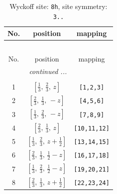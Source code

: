 \documentclass[fleqn,8pt]{jsarticle}
\begin{document}
\begin{longtable}{ccc}
\caption{Wyckoff site: {\tt 8h}, site symmetry: {\tt 3..}}
 \\
 \hline \hline
No. & position & mapping \\ \hline \endfirsthead

\multicolumn{2}{l}{\tablename\ \thetable{}} \\
 \hline \hline
No. & position & mapping \\ \hline \endhead

 \hline \hline
\multicolumn{2}{r}{\footnotesize\it continued ...} \\ \endfoot

 \hline \hline
\multicolumn{2}{r}{} \\ \endlastfoot

1 & $\left[ \frac{1}{3},\, \frac{2}{3},\, z \right]$ & {\tt [1,2,3]} \\ \hline
2 & $\left[ \frac{2}{3},\, \frac{1}{3},\, - z \right]$ & {\tt [4,5,6]} \\ \hline
3 & $\left[ \frac{1}{3},\, \frac{2}{3},\, - z \right]$ & {\tt [7,8,9]} \\ \hline
4 & $\left[ \frac{2}{3},\, \frac{1}{3},\, z \right]$ & {\tt [10,11,12]} \\ \hline
5 & $\left[ \frac{1}{3},\, \frac{2}{3},\, z + \frac{1}{2} \right]$ & {\tt [13,14,15]} \\ \hline
6 & $\left[ \frac{2}{3},\, \frac{1}{3},\, \frac{1}{2} - z \right]$ & {\tt [16,17,18]} \\ \hline
7 & $\left[ \frac{1}{3},\, \frac{2}{3},\, \frac{1}{2} - z \right]$ & {\tt [19,20,21]} \\ \hline
8 & $\left[ \frac{2}{3},\, \frac{1}{3},\, z + \frac{1}{2} \right]$ & {\tt [22,23,24]} \\
\end{longtable}
\renewcommand{\arraystretch}{1.2}
\end{document}
